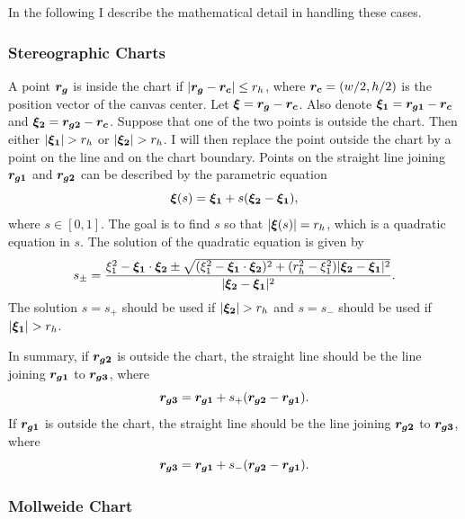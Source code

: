 \documentclass[12pt]{article}
\newcommand \beq {\begin{equation}}
\newcommand \eeq {\end{equation}}
\newcommand{\ve}[1]{\mbox{\boldmath $#1$}}
\begin{document}
In the following I describe the mathematical detail in handling these 
cases.

\subsubsection{Stereographic Charts}

A point $\ve{r_g}$ is inside the chart if $|\ve{r_g}-\ve{r_c}| \leq r_h$, 
where $\ve{r_c}=(w/2,h/2)$ is the position vector of the canvas center. 
Let $\ve{\xi}=\ve{r_g}-\ve{r_c}$. Also denote $\ve{\xi_1}=\ve{r_{g1}}-\ve{r_c}$ 
and $\ve{\xi_2}=\ve{r_{g2}}-\ve{r_c}$. Suppose that one of the two points is 
outside the chart. Then either $|\ve{\xi_1}|>r_h$ or $|\ve{\xi_2}|>r_h$. 
I will then replace the point outside the chart by a point on the line and on 
the chart boundary. Points on the straight line joining $\ve{r_{g1}}$ and 
$\ve{r_{g2}}$ can be described by the parametric equation 
\beq
  \ve{\xi}(s) = \ve{\xi_1} + s(\ve{\xi_2}-\ve{\xi_1}) ,
\eeq
where $s \in [0,1]$. The goal is to find $s$ so that $|\ve{\xi}(s)|=r_h$, 
which is a quadratic equation in $s$. The solution of the quadratic equation 
is given by 
\beq
  s_{\pm} = \frac{\xi_1^2 - \ve{\xi_1}\cdot \ve{\xi_2} \pm 
\sqrt{(\xi_1^2 - \ve{\xi_1}\cdot \ve{\xi_2})^2 + (r_h^2-\xi_1^2) |\ve{\xi_2}-\ve{\xi_1}|^2}}
{|\ve{\xi_2}-\ve{\xi_1}|^2} .
\eeq
The solution $s=s_+$ should be used if $|\ve{\xi_2}|>r_h$ and $s=s_-$ should be 
used if $|\ve{\xi_1}|>r_h$.

In summary, if $\ve{r_{g2}}$ is outside the chart, the straight line should be 
the line joining $\ve{r_{g1}}$ to $\ve{r_{g3}}$, where 
\beq
  \ve{r_{g3}} = \ve{r_{g1}} + s_+ (\ve{r_{g2}}-\ve{r_{g1}}) .
\eeq
If $\ve{r_{g1}}$ is outside the chart, the straight line should be
the line joining $\ve{r_{g2}}$ to $\ve{r_{g3}}$, where
\beq
  \ve{r_{g3}} = \ve{r_{g1}} + s_- (\ve{r_{g2}}-\ve{r_{g1}}) .
\eeq

\subsubsection{Mollweide Chart} 
\end{document}
